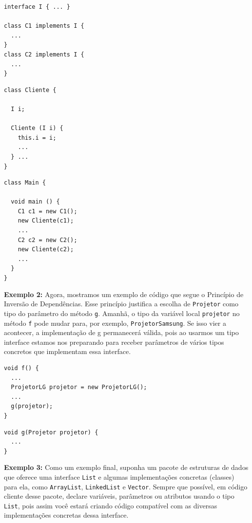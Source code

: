 \documentclass[
  11pt,
  twoside]{book}
\newcommand{\passthrough}[1]{#1}
\begin{document}
\begin{lstlisting}
interface I { ... }

class C1 implements I {
  ...
}
class C2 implements I {
  ...
}
\end{lstlisting}

\begin{lstlisting}
class Cliente {

  I i;

  Cliente (I i) {
    this.i = i;
    ...
  } ...
}
\end{lstlisting}

\begin{lstlisting}
class Main {

  void main () {
    C1 c1 = new C1();
    new Cliente(c1);
    ...
    C2 c2 = new C2();
    new Cliente(c2);
    ...
  }
}
\end{lstlisting}

\textbf{Exemplo 2:} Agora, mostramos um exemplo de código que segue o
Princípio de Inversão de Dependências. Esse princípio justifica a
escolha de \passthrough{\lstinline!Projetor!} como tipo do parâmetro do
método \passthrough{\lstinline!g!}. Amanhã, o tipo da variável local
\passthrough{\lstinline!projetor!} no método \passthrough{\lstinline!f!}
pode mudar para, por exemplo, \passthrough{\lstinline!ProjetorSamsung!}.
Se isso vier a acontecer, a implementação de g permanecerá válida, pois
ao usarmos um tipo interface estamos nos preparando para receber
parâmetros de vários tipos concretos que implementam essa interface.

\newpage

\begin{lstlisting}
void f() {
  ...
  ProjetorLG projetor = new ProjetorLG();
  ...
  g(projetor);
}
\end{lstlisting}

\begin{lstlisting}
void g(Projetor projetor) {
  ...
}
\end{lstlisting}

\textbf{Exemplo 3:} Como um exemplo final, suponha um pacote de
estruturas de dados que oferece uma interface
\passthrough{\lstinline!List!} e algumas implementações concretas
(classes) para ela, como \passthrough{\lstinline!ArrayList!},
\passthrough{\lstinline!LinkedList!} e \passthrough{\lstinline!Vector!}.
Sempre que possível, em código cliente desse pacote, declare variáveis,
parâmetros ou atributos usando o tipo \passthrough{\lstinline!List!},
pois assim você estará criando código compatível com as diversas
implementações concretas dessa interface.
\end{document}
